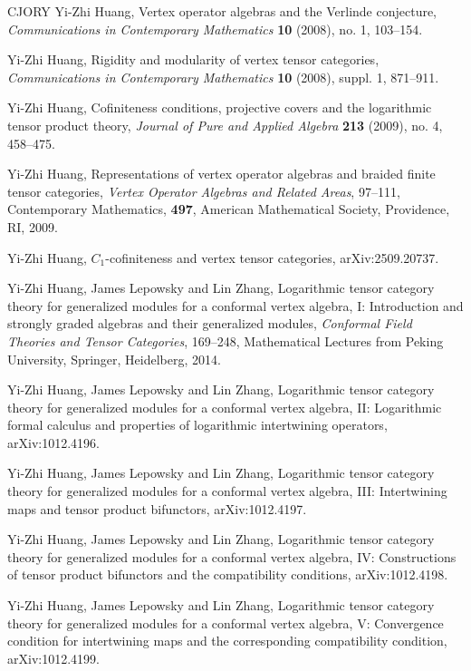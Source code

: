 \documentclass[11pt, reqno]{amsart}
\theoremstyle{definition}\newtheorem{defi}[thm]{Definition}
\theoremstyle{definition}\newtheorem{rem}[thm]{Remark}
\theoremstyle{definition}\newtheorem{exam}[thm]{Example}
\theoremstyle{definition}\newtheorem{assum}[thm]{Assumption}
\begin{document}
\begin{thebibliography}{CJORY}
Yi-Zhi Huang, Vertex operator algebras and the Verlinde conjecture, \textit{Communications in Contemporary Mathematics} \textbf{10} (2008), no. 1, 103--154.

Yi-Zhi Huang,  Rigidity and modularity of vertex tensor categories, \textit{Communications in Contemporary Mathematics} \textbf{10} (2008), suppl. 1, 871--911.

Yi-Zhi Huang, Cofiniteness conditions, projective covers and the logarithmic tensor product theory, \textit{Journal of Pure and Applied Algebra}  \textbf{213}  (2009), no. 4, 458--475.

Yi-Zhi Huang, Representations of vertex operator algebras and braided finite tensor categories, \textit{Vertex Operator Algebras and Related Areas}, 97--111, Contemporary Mathematics, \textbf{497}, American Mathematical Society, Providence, RI, 2009.

Yi-Zhi Huang, $C_1$-cofiniteness and vertex tensor categories, arXiv:2509.20737.

Yi-Zhi Huang, James Lepowsky and Lin Zhang, Logarithmic tensor category theory for generalized modules for a
conformal vertex algebra, I: Introduction and strongly graded algebras and their generalized modules, \textit{Conformal Field Theories and Tensor Categories}, 169--248, Mathematical Lectures from Peking University, Springer, Heidelberg, 2014.

Yi-Zhi Huang, James Lepowsky and Lin Zhang, Logarithmic tensor category theory for
generalized modules for a conformal vertex algebra, II: Logarithmic formal
calculus and properties of logarithmic intertwining operators, arXiv:1012.4196.

Yi-Zhi Huang, James Lepowsky and Lin Zhang, Logarithmic tensor category theory for
generalized modules for a conformal vertex algebra, III: Intertwining maps and
tensor product bifunctors, arXiv:1012.4197.
	
Yi-Zhi Huang, James Lepowsky and Lin Zhang, Logarithmic tensor category theory for
generalized modules for a conformal vertex algebra, IV: Constructions of tensor
product bifunctors and the compatibility conditions, arXiv:1012.4198.
	
Yi-Zhi Huang, James Lepowsky and Lin Zhang, Logarithmic tensor category theory for
generalized modules for a conformal vertex algebra, V: Convergence condition
for intertwining maps and the corresponding compatibility condition,
arXiv:1012.4199.
	

\end{thebibliography}
\end{document}
